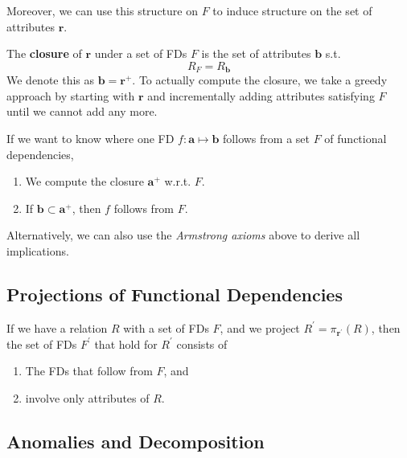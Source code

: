 \documentclass{article}
\begin{document}
      Moreover, we can use this structure on $F$ to induce structure on the set of attributes $\mathbf{r}$. 

      \begin{definition}
        The \textbf{closure} of $\mathbf{r}$ under a set of FDs $F$ is the set of attributes $\mathbf{b}$ s.t. 
        \begin{equation}
          R_F = R_\mathbf{b}
        \end{equation}
        We denote this as $\mathbf{b} = \mathbf{r}^+$. To actually compute the closure, we take a greedy approach by starting with $\mathbf{r}$ and incrementally adding attributes satisfying $F$ until we cannot add any more. 
      \end{definition}

      \begin{theorem}
        If we want to know where one FD $f: \mathbf{a} \mapsto \mathbf{b}$ follows from a set $F$ of functional dependencies, 
        \begin{enumerate}
          \item We compute the closure $\mathbf{a}^+$ w.r.t. $F$. 
          \item If $\mathbf{b} \subset \mathbf{a}^+$, then $f$ follows from $F$. 
        \end{enumerate}
        Alternatively, we can also use the \textit{Armstrong axioms} above to derive all implications. 
      \end{theorem}
    
  \subsection{Projections of Functional Dependencies} 

    If we have a relation $R$ with a set of FDs $F$, and we project $R^\prime = \pi_{\mathbf{r}^\prime} (R)$, then the set of FDs $F^\prime$ that hold for $R^\prime$ consists of 
    \begin{enumerate}
      \item The FDs that follow from $F$, and 
      \item involve only attributes of $R$. 
    \end{enumerate}

  \subsection{Anomalies and Decomposition}
\end{document}
